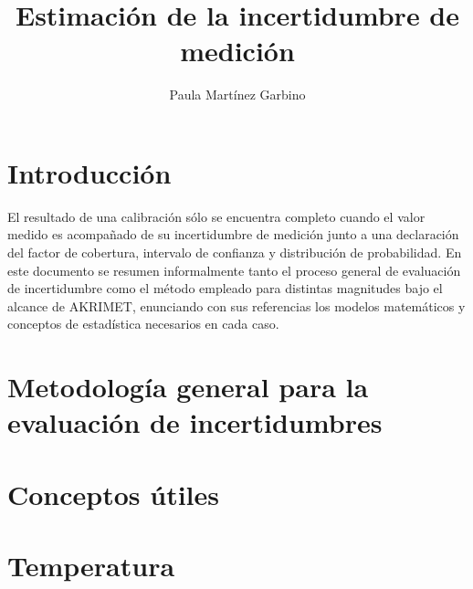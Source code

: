 \documentclass[12pt]{article}
\title{Estimación de la incertidumbre de medición}
\author{Paula Martínez Garbino}
\begin{document}
\maketitle
\section{Introducción}

El resultado de una calibración sólo se encuentra completo cuando el valor medido es acompañado de su incertidumbre de medición junto a una declaración del factor de cobertura, intervalo de confianza y distribución de probabilidad. En este documento se resumen informalmente tanto el proceso general de evaluación de incertidumbre como el método empleado para distintas magnitudes bajo el alcance de AKRIMET, enunciando con sus referencias los modelos matemáticos y conceptos de estadística necesarios en cada caso.\cite{GUM}

\section{Metodología general para la evaluación de incertidumbres}



\section{Conceptos útiles}



\section{Temperatura}\label{sec:temperatura}



% 
% 
\printbibliography{}
\end{document}
